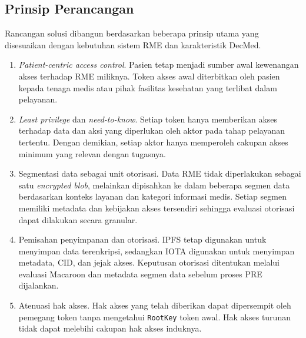 \subsection{Prinsip Perancangan}
\label{subsec:prinsip-perancangan}

Rancangan solusi dibangun berdasarkan beberapa prinsip utama yang disesuaikan dengan kebutuhan sistem RME dan karakteristik DecMed.

\begin{enumerate}[leftmargin=*]
	\item \textit{Patient-centric access control}. Pasien tetap menjadi sumber awal kewenangan akses terhadap RME miliknya. Token akses awal diterbitkan oleh pasien kepada tenaga medis atau pihak fasilitas kesehatan yang terlibat dalam pelayanan.

	\item \textit{Least privilege} dan \textit{need-to-know}. Setiap token hanya memberikan akses terhadap data dan aksi yang diperlukan oleh aktor pada tahap pelayanan tertentu. Dengan demikian, setiap aktor hanya memperoleh cakupan akses minimum yang relevan dengan tugasnya.

	\item Segmentasi data sebagai unit otorisasi. Data RME tidak diperlakukan sebagai satu \textit{encrypted blob}, melainkan dipisahkan ke dalam beberapa segmen data berdasarkan konteks layanan dan kategori informasi medis. Setiap segmen memiliki metadata dan kebijakan akses tersendiri sehingga evaluasi otorisasi dapat dilakukan secara granular.

	\item Pemisahan penyimpanan dan otorisasi. IPFS tetap digunakan untuk menyimpan data terenkripsi, sedangkan IOTA digunakan untuk menyimpan metadata, CID, dan jejak akses. Keputusan otorisasi ditentukan melalui evaluasi Macaroon dan metadata segmen data sebelum proses PRE dijalankan.

	\item Atenuasi hak akses. Hak akses yang telah diberikan dapat dipersempit oleh pemegang token tanpa mengetahui \texttt{RootKey} token awal. Hak akses turunan tidak dapat melebihi cakupan hak akses induknya.
\end{enumerate}